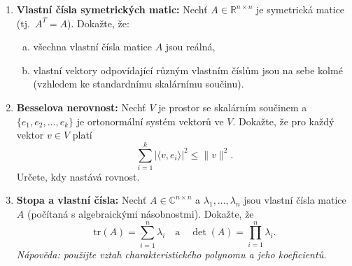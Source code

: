 \documentclass[a4paper,11pt]{article}
\begin{document}
\begin{enumerate}
    \item \textbf{Vlastní čísla symetrických matic:} Nechť $A \in \mathbb{R}^{n \times n}$ je symetrická matice (tj.\ $A^T = A$). Dokažte, že:
    \begin{enumerate}[(a)]
        \item všechna vlastní čísla matice $A$ jsou reálná,
        \item vlastní vektory odpovídající různým vlastním číslům jsou na sebe kolmé (vzhledem ke standardnímu skalárnímu součinu).
    \end{enumerate}
    
    \item \textbf{Besselova nerovnost:} Nechť $V$ je prostor se skalárním součinem a $\{e_1, e_2, \ldots, e_k\}$ je ortonormální systém vektorů ve $V$. Dokažte, že pro každý vektor $v \in V$ platí
    $$
    \sum_{i=1}^{k} |\langle v, e_i \rangle|^2 \leq \|v\|^2.
    $$
    Určete, kdy nastává rovnost.
    
    \item \textbf{Stopa a vlastní čísla:} Nechť $A \in \mathbb{C}^{n \times n}$ a $\lambda_1, \ldots, \lambda_n$ jsou vlastní čísla matice $A$ (počítaná s algebraickými násobnostmi). Dokažte, že
    $$
    \mathrm{tr}(A) = \sum_{i=1}^{n} \lambda_i \quad \text{a} \quad \det(A) = \prod_{i=1}^{n} \lambda_i.
    $$
    \textit{Nápověda: použijte vztah charakteristického polynomu a jeho koeficientů.}
\end{enumerate}
\end{document}
